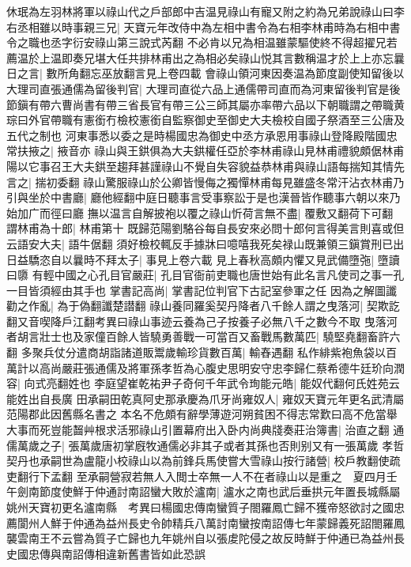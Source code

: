 休珉為左羽林將軍以祿山代之戶部郎中吉温見祿山有寵又附之約為兄弟說祿山曰李右丞相雖以時事親三兄|{
	天寶元年改侍中為左相中書令為右相李林甫時為右相中書令之職也丞字衍安祿山第三說式芮翻}
不必肯以兄為相温雖蒙驅使終不得超擢兄若薦温於上温即奏兄堪大任共排林甫出之為相必矣祿山悦其言數稱温才於上上亦忘曩日之言|{
	數所角翻忘巫放翻言見上卷四載}
會祿山領河東因奏温為節度副使知留後以大理司直張通儒為留後判官|{
	大理司直從六品上通儒帶司直而為河東留後判官是後節鎭有帶六曹尚書有帶三省長官有帶三公三師其屬亦率帶六品以下朝職謂之帶職黄琮曰外官帶職有憲銜冇檢校憲銜自監察御史至御史大夫檢校自國子祭酒至三公唐及五代之制也}
河東事悉以委之是時楊國忠為御史中丞方承恩用事祿山登降殿階國忠常扶掖之|{
	掖音亦}
祿山與王鉷俱為大夫鉷權任亞於李林甫祿山見林甫禮貌頗倨林甫陽以它事召王大夫鉷至趨拜甚謹祿山不覺自失容貌益恭林甫與祿山語每揣知其情先言之|{
	揣初委翻}
祿山驚服祿山於公卿皆慢侮之獨憚林甫每見雖盛冬常汗沾衣林甫乃引與坐於中書廳|{
	廳他經翻中庭日聽事言受事察訟于是也漢晉皆作聽事六朝以來乃始加广而徑曰廳}
撫以温言自解披袍以覆之祿山忻荷言無不盡|{
	覆敷又翻荷下可翻}
謂林甫為十郎|{
	林甫第十}
既歸范陽劉駱谷每自長安來必問十郎何言得美言則喜或但云語安大夫|{
	語牛倨翻}
須好檢校輒反手據牀曰噫嘻我死矣禄山既兼領三鎭賞刑已出日益驕恣自以曩時不拜太子|{
	事見上卷六載}
見上春秋高頗内懼又見武備墮㢮|{
	墮讀曰隳}
有輕中國之心孔目官嚴莊|{
	孔目官衙前吏職也唐世始有此名言凡使司之事一孔一目皆須經由其手也}
掌書記高尚|{
	掌書記位判官下古記室參軍之任}
因為之解圖讖勸之作亂|{
	為于偽翻讖楚譛翻}
祿山養同羅奚契丹降者八千餘人謂之曳落河|{
	契欺訖翻又音喫降戶江翻考異曰祿山事迹云養為己子按養子必無八千之數今不取}
曳落河者胡言壯士也及家僮百餘人皆驍勇善戰一可當百又畜戰馬數萬匹|{
	驍堅堯翻畜許六翻}
多聚兵仗分遣商胡詣諸道販鬻歲輸珍貨數百萬|{
	輸舂遇翻}
私作緋紫袍魚袋以百萬計以高尚嚴莊張通儒及將軍孫孝哲為心腹史思明安守忠李歸仁蔡希德牛廷玠向潤容|{
	向式亮翻姓也}
李庭望崔乾祐尹子奇何千年武令珣能元皓|{
	能奴代翻何氏姓苑云能姓出自長廣}
田承嗣田乾真阿史那承慶為爪牙尚雍奴人|{
	雍奴天寶元年更名武清屬范陽郡此因舊縣名書之}
本名不危頗有辭學薄遊河朔貧困不得志常歎曰高不危當舉大事而死豈能齧艸根求活邪祿山引置幕府出入卧内尚典牋奏莊治簿書|{
	治直之翻}
通儒萬歲之子|{
	張萬歲唐初掌廐牧通儒必非其子或者其孫也否則别又有一張萬歲}
孝哲契丹也承嗣世為盧龍小校祿山以為前鋒兵馬使嘗大雪祿山按行諸營|{
	校戶教翻使疏吏翻行下孟翻}
至承嗣營寂若無人入閲士卒無一人不在者祿山以是重之　夏四月壬午劍南節度使鮮于仲通討南詔蠻大敗於瀘南|{
	瀘水之南也武后垂拱元年置長城縣屬姚州天寶初更名瀘南縣　考異曰楊國忠傳南蠻質子閤羅鳳亡歸不獲帝怒欲討之國忠薦閬州人鮮于仲通為益州長史令帥精兵八萬討南蠻按南詔傳七年蒙歸義死詔閤羅鳳襲雲南王不云嘗為質子亡歸也九年姚州自以張䖍陀侵之故反時鮮于仲通已為益州長史國忠傳與南詔傳相違新舊書皆如此恐誤}
